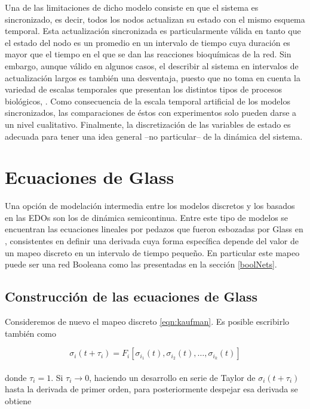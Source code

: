 Una de las limitaciones de dicho modelo consiste en que el sistema es sincronizado, es decir, todos los nodos actualizan su estado con el mismo esquema temporal. Esta actualización sincronizada es particularmente válida en tanto que el estado del nodo es un promedio en un intervalo de tiempo cuya duración es mayor que el tiempo en el que se dan las reacciones bioquímicas de la red. Sin embargo, aunque válido en algunos casos, el describir al sistema en intervalos de actualización largos es también una desventaja, puesto que no toma en cuenta la variedad de escalas temporales que presentan los distintos tipos de procesos biológicos, \citeauthor{Reka3Nodos2010} \citep{Reka3Nodos2010}. Como consecuencia de la escala temporal artificial de los modelos sincronizados, las comparaciones de éstos con experimentos solo pueden darse a un nivel cualitativo. Finalmente, la discretización de las variables de estado es adecuada para tener una idea general --no particular-- de la dinámica del sistema. 

\section{Ecuaciones de Glass}

Una opción de modelación intermedia entre los modelos discretos y los basados en las \ac{EDOs} son los de dinámica semicontinua. Entre este tipo de modelos se encuentran las ecuaciones lineales por pedazos que fueron esbozadas por Glass en \citeauthor{Glass1973} \citep{Glass1973}, consistentes en definir una derivada cuya forma específica depende del valor de un mapeo discreto en un intervalo de tiempo pequeño. En particular este mapeo puede ser una red Booleana como las presentadas en la sección \ref{boolNets}.

\subsection{Construcción de las ecuaciones de Glass}

Consideremos de nuevo el mapeo discreto \ref{eqn:kaufman}. Es posible escribirlo también como

\begin{equation}
\sigma_i(t+\tau_i)=F_i[\sigma_{i_1}(t),\sigma_{i_2}(t),\ldots,\sigma_{i_k}(t)]
\end{equation}
\\
donde $\tau_i=1$. Si $\tau_i \rightarrow 0$, haciendo un desarrollo en serie de Taylor de $\sigma_i(t+\tau_i)$ hasta la derivada de primer orden, para posteriormente despejar esa derivada se obtiene

